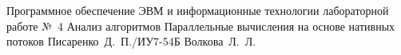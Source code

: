 \documentclass{bmstu}[a4paper]
\begin{document}
    {Программное обеспечение ЭВМ и информационные технологии}
    {лабораторной работе №~4}
    {Анализ алгоритмов}
    {Параллельные вычисления на основе нативных потоков}
    {}
    {Писаренко~Д.~П./ИУ7-54Б}
    {Волкова~Л.~Л.}

    \maketableofcontents

    
    
    
    
    
    

    \makebibliography
\end{document}
